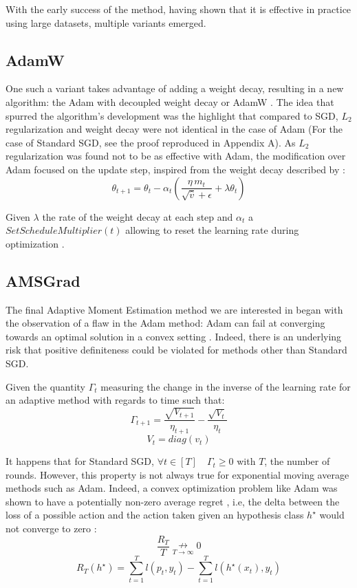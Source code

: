 \documentclass{article} %
\begin{document}
With the early success of the method, having shown that it is effective in practice using
large datasets, multiple variants emerged.

\subsection{AdamW}

One such a variant takes advantage of adding a weight decay, resulting in a new algorithm: the
Adam with decoupled weight decay or AdamW \citep{loshchilov2019decoupled}. The idea that spurred
the algorithm's development was the highlight that compared to SGD, $L_2$ regularization and
weight decay were not identical in the case of Adam (For the case of Standard SGD, see the proof
reproduced in Appendix A). As $L_2$ regularization was found not to be as effective 
with Adam, the modification over Adam focused on the update step, inspired from the weight decay
described by \citet{10.5555/2969735.2969756}:
$$\theta_{t+1} = \theta_t - \alpha_t(\frac{\eta\,m_t}{\sqrt{\hat{v}}+\epsilon}+\lambda\theta_{t})$$

Given $\lambda$ the rate of the weight decay at each step and $\alpha_t$ a $SetScheduleMultiplier(t)$
allowing to reset the learning rate during optimization \citep{loshchilov2019decoupled}.

\subsection{AMSGrad}

The final Adaptive Moment Estimation method we are interested in began with the observation of 
a flaw in the Adam method: Adam can fail at converging towards an optimal solution in a convex 
setting \citep{reddi2019convergence}. Indeed, there is an underlying risk that positive definiteness 
could be violated for methods other than Standard SGD.

Given the quantity $\Gamma_t$ measuring the change in the inverse of the learning rate for an 
adaptive method with regards to time such that:
$$\Gamma_{t+1} = \frac{\sqrt{V_{t+1}}}{\eta_{t+1}} - \frac{\sqrt{V_t}}{\eta_t} $$
$$V_t = {diag}(v_t)$$

It happens that for Standard SGD, $\forall t \in [T]\quad \Gamma_t \ge 0$ with $T$, the number 
of rounds. However, this property is not always true for exponential moving average methods such 
as Adam. Indeed, a convex optimization problem like Adam was shown to have a potentially non-zero 
average regret \citep{10.1561/2200000018}, i.e, the delta between the loss of a possible action 
and the action taken given an hypothesis class $h^\star$ would not converge to 
zero \citep{reddi2019convergence}:
$$\frac{R_T}{T} \underset{T\rightarrow\infty}{\nrightarrow} 0$$
$$R_T(h^\star) = \overset{T}{\underset{t=1}{\sum}}l(p_t, y_t) - \overset{T}{\underset{t=1}{\sum}}l(h^\star(x_t), y_t)$$
\end{document}
